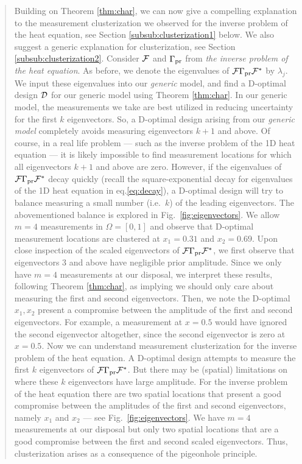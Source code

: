 \begin{quote}
  Building on Theorem \ref{thm:char}, we can now give a compelling
  explanation to the measurement clusterization we observed for the
  inverse problem of the heat equation, see Section
  \ref{subsub:clusterization1} below. We also suggest a generic
  explanation for clusterization, see Section
  \ref{subsub:clusterization2}.
  \newline
  Consider $\mathcal{F}$ and $\Gamma_{\textup{pr}}$ from \emph{the inverse problem of the
  heat equation}. As before, we denote the eigenvalues of
  $\mathcal{F}\Gamma_{\textup{pr}}\mathcal{F}^*$ by $\lambda_j$. We input these eigenvalues into
  our \emph{generic} model, and find a D-optimal design $\mathcal{D}$ for our
  generic model using Theorem \ref{thm:char}. In our generic model,
  the measurements we take are best utilized in reducing uncertainty
  for the first $k$ eigenvectors. So, a D-optimal design arising from
  our \emph{generic model} completely avoids measuring eigenvectors
  $k+1$ and above.
  \newline
  Of course, in a real life problem --- such as the inverse problem of
  the 1D heat equation --- it is likely impossible to find measurement
  locations for which all eigenvectors $k+1$ and above are
  zero. However, if the eigenvalues of $\mathcal{F}\Gamma_{\textup{pr}}\mathcal{F}^*$ decay
  quickly (recall the square-exponential decay for eigenvalues of the
  1D heat equation in eq.\eqref{eq:decay}), a D-optimal design will
  try to balance measuring a small number (i.e.~$k$) of the leading
  eigenvectors.
  \newline
  The abovementioned balance is explored in
  Fig.~\ref{fig:eigenvectors}. We allow $m=4$ measurements in $\Omega
  = [0,1]$ and observe that D-optimal measurement locations are
  clustered at $x_1 = 0.31$ and $x_2 = 0.69$. Upon close inspection of
  the scaled eigenvectors of $\mathcal{F} \Gamma_{\textup{pr}} \mathcal{F}^*$, we first observe
  that eigenvectors $3$ and above have negligible prior
  amplitude. Since we only have $m=4$ measurements at our disposal, we
  interpret these results, following Theorem \ref{thm:char}, as
  implying we should only care about measuring the first and second
  eigenvectors. Then, we note the D-optimal $x_1,x_2$ present a
  compromise between the amplitude of the first and second
  eigenvectors. For example, a measurement at $x=0.5$ would have
  ignored the second eigenvector altogether, since the second
  eigenvector is zero at $x=0.5$.
  \newline
  Now we can understand measurement clusterization for the inverse
  problem of the heat equation. A D-optimal design attempts to measure
  the first $k$ eigenvectors of $\mathcal{F} \Gamma_{\textup{pr}} \mathcal{F}^*$. But there may be
  (spatial) limitations on where these $k$ eigenvectors have large
  amplitude. For the inverse problem of the heat equation there are
  two spatial locations that present a good compromise between the
  amplitudes of the first and second eigenvectors, namely $x_1$ and
  $x_2$ --- see Fig.~\ref{fig:eigenvectors}. We have $m=4$
  measurements at our disposal but only two spatial locations that are
  a good compromise between the first and second scaled
  eigenvectors. Thus, clusterization arises as a consequence of the
  pigeonhole principle.
\end{quote}

